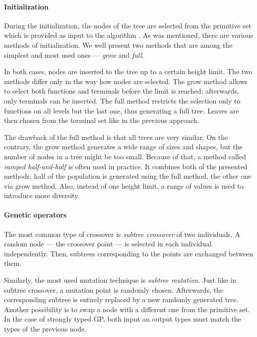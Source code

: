 \paragraph{Initialization}
During the initialization, the nodes of the tree are selected from the
primitive set which is provided as input to the algorithm
\citep{Koza:1992:GPP:138936}. As was mentioned, there are various methods of 
initialization. We well present two methods that are among the simplest and 
most used ones --- \emph{grow} and \emph{full}.

In both cases, nodes are inserted to the tree up to a certain height limit.
The two methods differ only in the way how nodes are selected. The grow method
allows to select both functions and terminals before the limit is reached;
afterwards, only terminals can be inserted. The full method restricts the
selection only to functions on all levels but the last one, thus generating 
a full tree. Leaves are then
chosen from the terminal set like in the previous approach.

The drawback of the full method is that all trees are very similar. On the
contrary, the grow method generates a wide range of sizes and shapes, but the
number of nodes in a tree might be too small. Because of that, a method called
\emph{ramped half-and-half} is often used in practice. It combines both 
of the presented methods; half of the population is generated using the full
method, the other one via grow method. Also, instead of one height limit, a
range of values is used to introduce more diversity.
\citep{Poli:2008:FGG:1796422}

\paragraph{Genetic operators} \label{treeops}
The most common type of crossover is \emph{subtree crossover} of two
individuals. A random node --- the crossover point ---
is selected in each individual independently. Then, subtrees corresponding
to the points are exchanged between them.

Similarly, the most used mutation technique is \emph{subtree mutation}.
Just like in subtree crossover, a mutation point is randomly chosen.
Afterwards, the corresponding subtree is entirely replaced by a new randomly
generated tree. Another possibility is to swap a node with a different one
from the primitive set. In the case of strongly typed GP, both input an output
types must match the types of the previous node.
\citep{Poli:2008:FGG:1796422}

